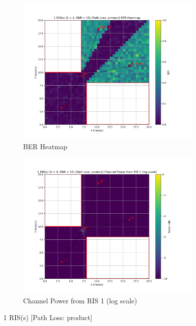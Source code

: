 \begin{figure}[H]
  \centering
  \begin{subfigure}[b]{0.48\textwidth}
    \centering
    \includegraphics[width=\textwidth]{imgs/heatmap-simulations/1 RIS(s) (K = 4, SNR = 10) [Path Loss_ product] BER Heatmap.png}
    \caption{BER Heatmap}
  \end{subfigure}
  \hfill
  \begin{subfigure}[b]{0.48\textwidth}
    \centering
    \includegraphics[width=\textwidth]{imgs/heatmap-simulations/1 RIS(s) (K = 4, SNR = 10) [Path Loss_ product] Channel Power from RIS 1 (log scale).png}
    \caption{Channel Power from RIS 1 (log scale)}
  \end{subfigure}
  \caption{1 RIS(s) [Path Loss: product]}
\end{figure}


